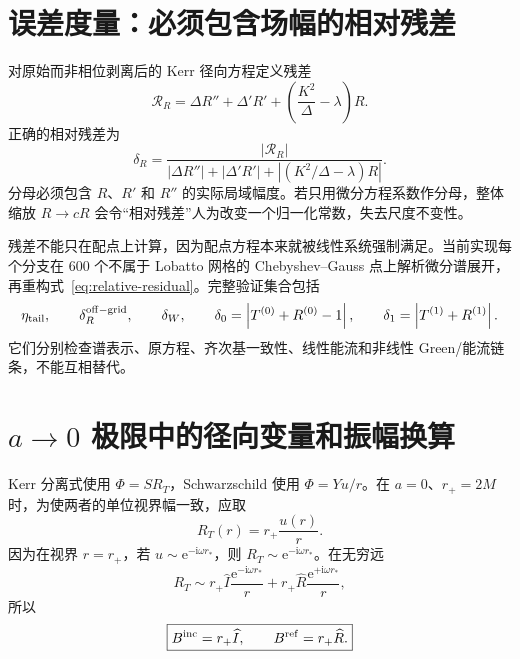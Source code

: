 \documentclass[UTF8,fontset=fandol,12pt,a4paper,oneside,openany]{ctexrep}
\newcommand{\ii}{\mathrm i}
\newcommand{\ee}{\mathrm e}
\newcommand{\Bin}{B^{\rm inc}}
\newcommand{\Bref}{B^{\rm ref}}
\newcommand{\Deltak}{\Delta}
\newcommand{\abs}[1]{\left|#1\right|}
\begin{document}
\section{误差度量：必须包含场幅的相对残差}
\label{sec:diagnostics}

对原始而非相位剥离后的 Kerr 径向方程定义残差
\begin{equation}
\mathcal R_R=\Deltak R''+\Deltak'R'
+\left(\frac{K^2}{\Deltak}-\lambda\right)R.
\end{equation}
正确的相对残差为
\begin{equation}
\boxed{
\delta_R=
\frac{\abs{\mathcal R_R}}
{\abs{\Deltak R''}+\abs{\Deltak'R'}
+\abs{(K^2/\Deltak-\lambda)R}}.}
\label{eq:relative-residual}
\end{equation}
分母必须包含 $R$、$R'$ 和 $R''$ 的实际局域幅度。若只用微分方程系数作分母，整体缩放 $R\to cR$ 会令“相对残差”人为改变一个归一化常数，失去尺度不变性。

残差不能只在配点上计算，因为配点方程本来就被线性系统强制满足。当前实现每个分支在 600 个不属于 Lobatto 网格的 Chebyshev--Gauss 点上解析微分谱展开，再重构式~\eqref{eq:relative-residual}。完整验证集合包括
\begin{equation}
\eta_{\rm tail},\qquad
\delta_R^{\rm off-grid},\qquad
\delta_W,\qquad
\delta_0=\abs{T^{(0)}+R^{(0)}-1},\qquad
\delta_1=\abs{T^{(1)}+R^{(1)}}.
\label{eq:all-diagnostics}
\end{equation}
它们分别检查谱表示、原方程、齐次基一致性、线性能流和非线性 Green/能流链条，不能互相替代。


\section{\texorpdfstring{$a\to0$}{a to 0} 极限中的径向变量和振幅换算}
\label{sec:a0}

Kerr 分离式使用 $\Phi=SR_T$，Schwarzschild 使用 $\Phi=Yu/r$。在 $a=0$、$r_+=2M$ 时，为使两者的单位视界幅一致，应取
\begin{equation}
\boxed{R_T(r)=r_+\frac{u(r)}{r}.}
\label{eq:RT-u}
\end{equation}
因为在视界 $r=r_+$，若 $u\sim\ee^{-\ii\omega r_*}$，则 $R_T\sim\ee^{-\ii\omega r_*}$。在无穷远
\begin{equation}
R_T\sim r_+\widehat I\frac{\ee^{-\ii\omega r_*}}{r}
+r_+\widehat R\frac{\ee^{+\ii\omega r_*}}{r},
\end{equation}
所以
\begin{equation}
\boxed{\Bin=r_+\widehat I,\qquad \Bref=r_+\widehat R.}
\label{eq:B-I}
\end{equation}
\end{document}
